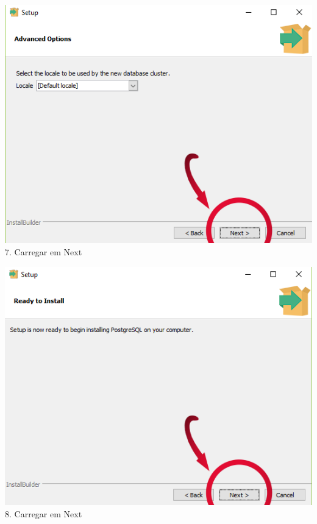 \documentclass[a4paper, 11pt]{article}
\begin{document}
\begin{minipage}{0.45\textwidth}
  \includegraphics[width=\textwidth]{image.psd(5).png}
  7. Carregar em Next
\end{minipage}\hfill
\begin{minipage}{0.45\textwidth}
  \includegraphics[width=\textwidth]{image.psd(6).png}
  8. Carregar em Next
\end{minipage}
\end{document}
